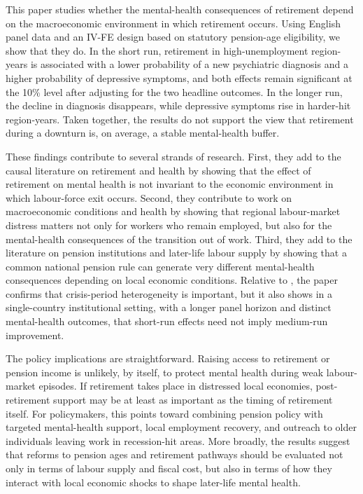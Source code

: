 \documentclass[arguments, manuscript, 11pt]{aastex631}
\begin{document}
This paper studies whether the mental-health consequences of retirement depend on the macroeconomic environment in which retirement occurs. Using English panel data and an IV-FE design based on statutory pension-age eligibility, we show that they do. In the short run, retirement in high-unemployment region-years is associated with a lower probability of a new psychiatric diagnosis and a higher probability of depressive symptoms, and both effects remain significant at the 10\% level after adjusting for the two headline outcomes. In the longer run, the decline in diagnosis disappears, while depressive symptoms rise in harder-hit region-years. Taken together, the results do not support the view that retirement during a downturn is, on average, a stable mental-health buffer.

These findings contribute to several strands of research. First, they add to the causal literature on retirement and health by showing that the effect of retirement on mental health is not invariant to the economic environment in which labour-force exit occurs. Second, they contribute to work on macroeconomic conditions and health by showing that regional labour-market distress matters not only for workers who remain employed, but also for the mental-health consequences of the transition out of work. Third, they add to the literature on pension institutions and later-life labour supply by showing that a common national pension rule can generate very different mental-health consequences depending on local economic conditions. Relative to \cite{belloni2016effect}, the paper confirms that crisis-period heterogeneity is important, but it also shows in a single-country institutional setting, with a longer panel horizon and distinct mental-health outcomes, that short-run effects need not imply medium-run improvement.

The policy implications are straightforward. Raising access to retirement or pension income is unlikely, by itself, to protect mental health during weak labour-market episodes. If retirement takes place in distressed local economies, post-retirement support may be at least as important as the timing of retirement itself. For policymakers, this points toward combining pension policy with targeted mental-health support, local employment recovery, and outreach to older individuals leaving work in recession-hit areas. More broadly, the results suggest that reforms to pension ages and retirement pathways should be evaluated not only in terms of labour supply and fiscal cost, but also in terms of how they interact with local economic shocks to shape later-life mental health.
\end{document}
